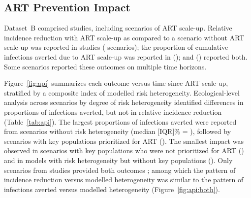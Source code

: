 \subsection{ART Prevention Impact}
\label{ss:res:api}
Dataset~B comprised  studies,
including  scenarios of ART scale-up.
Relative incidence reduction with ART scale-up
as compared to a scenario without ART scale-up
was reported in  studies ( scenarios);
the proportion of cumulative infections averted due to ART scale-up
was reported in  ();
and  () reported both.
Some scenarios reported these outcomes on multiple time horizons.
\par
Figure~\ref{fig:api} summarizes each outcome versus time since ART scale-up,
stratified by a composite index of modelled risk heterogeneity.
Ecological-level analysis across scenarios by degree of risk heterogeneity
identified differences in proportions of infections averted,
but not in relative incidence reduction (Table~\ref{tab:api}).
The largest proportions of infections averted were reported from 
scenarios without risk heterogeneity (median [IQR]\% = ), followed by
scenarios with key populations prioritized for ART ().
The smallest impact was observed in scenarios with
key populations who were not prioritized for ART ()
and in models with risk heterogeneity but without key populations
().
Only  scenarios from  studies provided both outcomes
\cite{Salomon2005,Abbas2006,Pretorius2010,Nichols2014,Barnighausen2016,Maheu-Giroux2017,Akudibillah2018}; %
among which the pattern of incidence reduction versus modelled heterogeneity
was similar to the pattern of infections averted versus modelled heterogeneity
(Figure~\ref{fig:api:both}).
